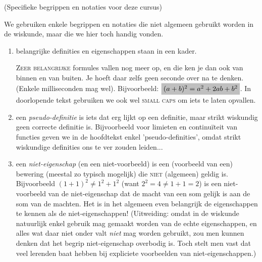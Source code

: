 \documentclass{ximera}
\begin{document}
\begin{notation} (Specifieke begrippen en notaties voor deze cursus) 
	
	We gebruiken enkele begrippen en notaties die niet algemeen gebruikt worden in de wiskunde, maar die we hier toch handig vonden.
	\begin{enumerate}
		\item belangrijke definities en eigenschappen staan in een kader.
		
		 \textsc{Zeer belangrijke} formules vallen nog meer op, en die ken je dan ook van binnen en van buiten. Je hoeft daar zelfs geen seconde over na te denken. (Enkele milliseconden mag wel). Bijvoorbeeld: $\important{(a+b)^2 = a^2 + 2ab + b^2}$. In doorlopende tekst gebruiken we ook wel \textsc{small caps} om iets te laten opvallen.
		\item een \textit{pseudo-definitie} is iets dat erg lijkt op een definitie, maar strikt wiskundig geen correcte definitie is. Bijvoorbeeld voor limieten en continuïteit van functies geven we in de hoofdtekst enkel 'pseudo-definities', omdat strikt wiskundige definities ons te ver zouden leiden...
		\item een \textit{niet-eigenschap} (en een niet-voorbeeld) is een (voorbeeld van een) bewering (meestal zo typisch mogelijk) die \textsc{niet} (algemeen) geldig is. Bijvoorbeeld $(1+1)^2 \neq 1^2+1^2$ (want $2^2 = 4 \neq 1 + 1 = 2$) is een niet-voorbeeld van de niet-eigenschap dat de macht van een som gelijk is aan de som van de machten. Het is in het algemeen even belangrijk de eigenschappen te kennen als de niet-eigenschappen! (Uitweiding: omdat in de wiskunde natuurlijk enkel gebruik mag gemaakt worden van de echte eigenschappen, en alles wat daar niet onder valt \textit{niet} mag worden gebruikt, zou men kunnen denken dat het begrip niet-eigenschap overbodig is. Toch stelt men vast dat veel lerenden baat hebben bij expliciete voorbeelden van niet-eigenschappen.)
	\end{enumerate}
\end{notation}
\end{document}
